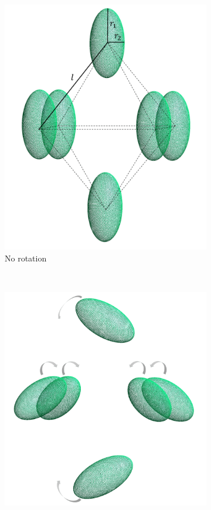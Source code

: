 \begin{figure}[H]
    \begin{subfigure}{\linewidth}
        \centering
        \includegraphics[scale = 0.4]{figures/6_ellip}
        \caption{No rotation}
        \label{No rotation 6}
        \end{subfigure}\\[1ex]
    \begin{subfigure}{.5\linewidth}
    \centering
    \includegraphics[scale = 0.4]{figures/6_ellip_in}

\end{subfigure}
\end{figure}
